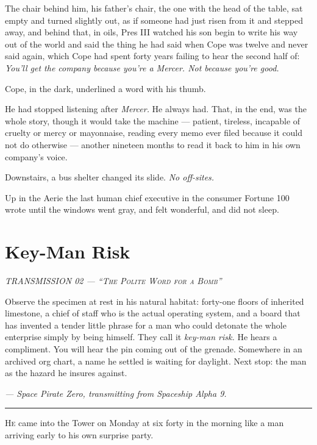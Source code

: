 \documentclass[11pt,openany]{book}
\newcommand{\transheader}{\normalfont\footnotesize\scshape\letterspace}
\newcommand{\letterspace}{}
\newenvironment{transmission}{%
  \par\vspace{0.3\baselineskip}\begin{center}\begin{minipage}{0.88\textwidth}%
  \itshape\small\setlength{\parindent}{0pt}\setstretch{1.06}}%
  {\end{minipage}\end{center}\vspace{0.4\baselineskip}%
  \noindent\hfil\rule{0.35\textwidth}{0.3pt}\hfil\par\vspace{1.0\baselineskip}}
\begin{document}
The chair behind him, his father's chair, the one with the head of the table, sat empty and turned slightly out, as if someone had just risen from it and stepped away, and behind that, in oils, Pres III watched his son begin to write his way out of the world and said the thing he had said when Cope was twelve and never said again, which Cope had spent forty years failing to hear the second half of: \textit{You'll get the company because you're a Mercer. Not because you're good.}

Cope, in the dark, underlined a word with his thumb.

He had stopped listening after \textit{Mercer.} He always had. That, in the end, was the whole story, though it would take the machine --- patient, tireless, incapable of cruelty or mercy or mayonnaise, reading every memo ever filed because it could not do otherwise --- another nineteen months to read it back to him in his own company's voice.

Downstairs, a bus shelter changed its slide. \textit{No off-sites.}

Up in the Aerie the last human chief executive in the consumer Fortune 100 wrote until the windows went gray, and felt wonderful, and did not sleep.

\clearpage
\chapter{Key-Man Risk}

\begin{transmission}
{\transheader TRANSMISSION 02 --- ``The Polite Word for a Bomb''}\par\vspace{0.5em}
Observe the specimen at rest in his natural habitat: forty-one floors of inherited limestone, a chief of staff who is the actual operating system, and a board that has invented a tender little phrase for a man who could detonate the whole enterprise simply by being himself. They call it \textit{key-man risk.} He hears a compliment. You will hear the pin coming out of the grenade. Somewhere in an archived org chart, a name he settled is waiting for daylight. Next stop: the man as the hazard he insures against.\par
\vspace{0.5em}\hfill\textit{--- Space Pirate Zero, transmitting from Spaceship Alpha 9.}\par
\end{transmission}


\lettrine[lines=3, lhang=0.05, nindent=0.25em]{H}{e} came into the Tower on Monday at six forty in the morning like a man arriving early to his own surprise party.
\end{document}
